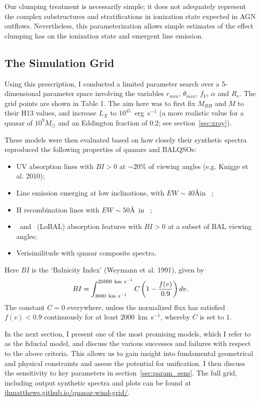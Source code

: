 Our clumping treatment is necessarily simple; it does not adequately
represent the complex substructures and stratifications in ionization
state expected in AGN outflows. 
Nevertheless, this parameterization 
allows simple estimates of the effect clumping has on the ionization 
state and emergent line emission.


\subsection{The Simulation Grid}

Using this prescription, I conducted a limited parameter
search over a 5-dimensional parameter space involving the 
variables $r_{min}$, $\theta_{min}$, $f_V$, $\alpha$ and $R_v$.
The grid points are shown in Table 1.
The aim here was to first fix $M_{BH}$ and $\dot{M}$ to their H13 values,
and increase $L_X$ to $10^{45}$~erg~s$^{-1}$ (a more realistic value for a 
quasar of $10^9M_\odot$ and an Eddington fraction of $0.2$; see section~\ref{sec:xray}).

These models were then evaluated based on 
how closely their synthetic spectra reproduced the 
following properties of quasars and BALQSOs:

\begin{itemize}
\item UV absorption lines 
with $BI > 0$ at $\sim20\%$ of viewing angles (e.g. Knigge et al. 2010);
\item Line emission emerging at low inclinations, with $EW\sim40$\AA in \civline\ \citep[e.g. ][]{shen2011};
\item H recombination lines with $EW\sim50$\AA\ in \la\ \citep[e.g. ][]{shen2011};
\item  \mg\ and \al\ (LoBAL) absorption features with $BI > 0$ at a subset of 
BAL viewing angles;
\item Verisimilitude with quasar composite spectra.
\end{itemize}
Here $BI$ is the `Balnicity Index' (Weymann et al. 1991), given by
\begin{equation}
BI = \int^{25000~{\rm km~s}^{-1}}_{3000~{\rm km~s}^{-1}} C \left( 1 - \frac{f(v)}{0.9} \right) dv.
\end{equation}
The constant $C=0$ everywhere, unless the normalized flux
has satisfied $f(v)<0.9$ continuously for at least $2000$~km~s$^{−1}$, 
whereby $C$ is set to $1$.

In the next section, I present one of the most promising models,
which I refer to as the fiducial model, and discuss
the various successes and failures with respect to the above criteria.
This allows us to gain insight into fundamental geometrical 
and physical constraints and assess the potential for unification. 
I then discuss the sensitivity to key parameters in section~\ref{sec:param_sens}.
The full grid, including output synthetic spectra and plots can be found at
\url{jhmatthews.github.io/quasar-wind-grid/}.

